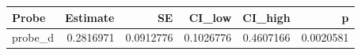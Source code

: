 
\begin{tabular}[t]{lrrrrr}
\toprule
Probe & Estimate & SE & CI\_low & CI\_high & p\\
\midrule
probe\_d & 0.2816971 & 0.0912776 & 0.1026776 & 0.4607166 & 0.0020581\\
\bottomrule
\end{tabular}
